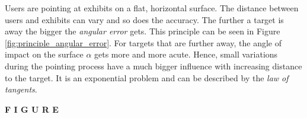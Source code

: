 
Users are pointing at exhibits on a flat, horizontal surface. The distance between users and exhibits can vary and so does the accuracy. The further a target is away the bigger the \textit{angular error} gets. This principle can be seen in Figure \ref{fig:principle_angular_error}. For targets that are further away, the angle of impact on the surface $\alpha$ gets more and more acute. Hence, small variations during the pointing process have a much bigger influence with increasing distance to the target. It is an exponential problem and can be described by the \textit{law of tangents}. 

\textbf{F I G U R E}

